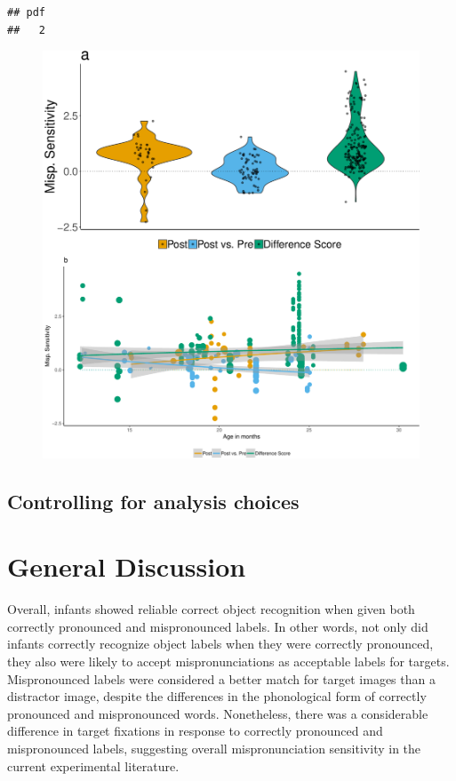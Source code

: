 \documentclass[man]{apa6}
\theoremstyle{definition}
\theoremstyle{definition}
\theoremstyle{definition}
\theoremstyle{remark}
\begin{document}
\begin{verbatim}
## pdf 
##   2
\end{verbatim}

\begin{figure}
\centering
\includegraphics{Paper_Analyses_files/figure-latex/Plot_Within_cond_age_diff_score-1.pdf}
\caption{}
\end{figure}

\subsection{Controlling for analysis
choices}\label{controlling-for-analysis-choices}

\section{General Discussion}\label{general-discussion}

Overall, infants showed reliable correct object recognition when given
both correctly pronounced and mispronounced labels. In other words, not
only did infants correctly recognize object labels when they were
correctly pronounced, they also were likely to accept mispronunciations
as acceptable labels for targets. Mispronounced labels were considered a
better match for target images than a distractor image, despite the
differences in the phonological form of correctly pronounced and
mispronounced words. Nonetheless, there was a considerable difference in
target fixations in response to correctly pronounced and mispronounced
labels, suggesting overall mispronunciation sensitivity in the current
experimental literature.
\end{document}
